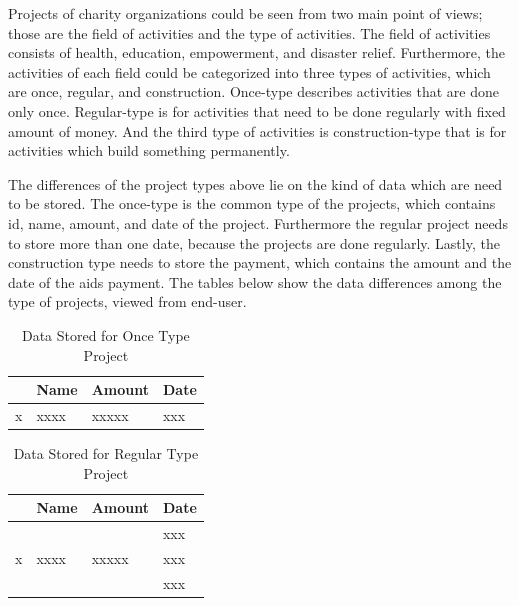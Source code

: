 \documentclass[runningheads,a4paper]{llncs}
\begin{document}
Projects of charity organizations could be seen from two main point of views; those are the field of activities and the type of activities. The field of activities consists of health, education, empowerment, and disaster relief. Furthermore, the activities of each field could be categorized into three types of activities, which are once, regular, and construction. Once-type describes activities that are done only once. Regular-type is for activities that need to be done regularly with fixed amount of money. And the third type of activities is construction-type that is for activities which build something permanently.

The differences of the project types above lie on the kind of data which are need to be stored. The once-type is the common type of the projects, which contains id, name, amount, and date of the project. Furthermore the regular project needs to store more than one date, because the projects are done regularly. Lastly, the construction type needs to store the payment, which contains the amount and the date of the aids payment. The tables below show the data differences among the type of projects, viewed from end-user.

\begin{table}[]
	\centering
	\caption{Data Stored for Once Type Project}
	\label{my-label}
	\begin{tabular}{|l|l|l|l|}
		\hline
		\rowcolor[HTML]{C0C0C0} 
		\multicolumn{1}{|c|}{\cellcolor[HTML]{C0C0C0}\textbf{Id}} & \multicolumn{1}{c|}{\cellcolor[HTML]{C0C0C0}\textbf{Name}} & \multicolumn{1}{c|}{\cellcolor[HTML]{C0C0C0}\textbf{Amount}} & \multicolumn{1}{c|}{\cellcolor[HTML]{C0C0C0}\textbf{Date}} \\ \hline
		x                                                         & xxxx                                                       & xxxxx                                                        & xxx                                                        \\ \hline
	\end{tabular}
\end{table}

\begin{table}[]
	\centering
	\caption{Data Stored for Regular Type Project}
	\label{my-label}
	\begin{tabular}{|l|l|l|l|}
		\hline
		\rowcolor[HTML]{C0C0C0} 
		\multicolumn{1}{|c|}{\textbf{Id}} & \multicolumn{1}{c|}{\textbf{Name}} & \multicolumn{1}{c|}{\textbf{Amount}} & \multicolumn{1}{c|}{\textbf{Date}} \\ \hline
		\multirow{3}{*}{x}                & \multirow{3}{*}{xxxx}              & \multirow{3}{*}{xxxxx}               & xxx                                \\ \cline{4-4} 
		&                                    &                                      & xxx                                \\ \cline{4-4} 
		&                                    &                                      & xxx                                \\ \hline
	\end{tabular}
\end{table}
\end{document}
